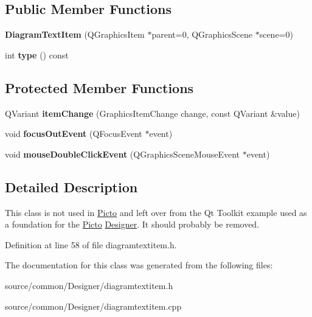 \subsection*{Public Member Functions}
\begin{DoxyCompactItemize}
\item 
\hypertarget{class_diagram_text_item_a4b878a588f0ad1b4fdf0f5c3a9661e52}{{\bfseries Diagram\-Text\-Item} (Q\-Graphics\-Item $\ast$parent=0, Q\-Graphics\-Scene $\ast$scene=0)}\label{class_diagram_text_item_a4b878a588f0ad1b4fdf0f5c3a9661e52}

\item 
\hypertarget{class_diagram_text_item_ac0365a84d97aa00239b144806d464f0f}{int {\bfseries type} () const }\label{class_diagram_text_item_ac0365a84d97aa00239b144806d464f0f}

\end{DoxyCompactItemize}
\subsection*{Protected Member Functions}
\begin{DoxyCompactItemize}
\item 
\hypertarget{class_diagram_text_item_a5c3167e120cc1113c2be30ccc5c03b44}{Q\-Variant {\bfseries item\-Change} (Graphics\-Item\-Change change, const Q\-Variant \&value)}\label{class_diagram_text_item_a5c3167e120cc1113c2be30ccc5c03b44}

\item 
\hypertarget{class_diagram_text_item_a77c5a54eb8386e9d80b9c446e32a4194}{void {\bfseries focus\-Out\-Event} (Q\-Focus\-Event $\ast$event)}\label{class_diagram_text_item_a77c5a54eb8386e9d80b9c446e32a4194}

\item 
\hypertarget{class_diagram_text_item_a4f7f3a7ca5352398c539af6473216820}{void {\bfseries mouse\-Double\-Click\-Event} (Q\-Graphics\-Scene\-Mouse\-Event $\ast$event)}\label{class_diagram_text_item_a4f7f3a7ca5352398c539af6473216820}

\end{DoxyCompactItemize}


\subsection{Detailed Description}
This class is not used in \hyperlink{namespace_picto}{Picto} and left over from the Qt Toolkit example used as a foundation for the \hyperlink{namespace_picto}{Picto} \hyperlink{class_designer}{Designer}. It should probably be removed. 

Definition at line 58 of file diagramtextitem.\-h.



The documentation for this class was generated from the following files\-:\begin{DoxyCompactItemize}
\item 
source/common/\-Designer/diagramtextitem.\-h\item 
source/common/\-Designer/diagramtextitem.\-cpp\end{DoxyCompactItemize}

